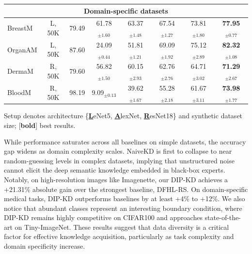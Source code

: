 \begin{table}[ht]
\begin{threeparttable}
\begin{tabular}{l c c c c c c c}
      \multicolumn{8}{c}{\textbf{Domain-specific datasets}} \\
      \midrule
      BreastM  & L, 50K  & 79.49 & 61.78$_{\pm 1.60}$           & 63.37$_{\pm 1.48}$           & 67.54$_{\pm 1.27}$ & 73.81$_{\pm 1.80}$          & \textbf{77.95}$_{\pm 0.77}$ \\
      OrganAM  & L, 50K  & 87.60 & 24.09$_{\pm 0.44}$           & 51.81$_{\pm 1.21}$           & 69.09$_{\pm 1.92}$ & 75.12$_{\pm 2.89}$          & \textbf{82.32}$_{\pm 1.08}$ \\
      DermaM   & R, 50K  & 79.60 & 56.82$_{\pm 1.50}$           & 60.15$_{\pm 2.93}$           & 62.76$_{\pm 2.76}$ & 64.71$_{\pm 3.02}$          & \textbf{71.29}$_{\pm 2.67}$ \\
      BloodM   & R, 50K  & 98.19 & \phantom{0}9.09$_{\pm 0.13}$ & 39.62$_{\pm 1.67}$           & 55.28$_{\pm 2.18}$ & 61.67$_{\pm 3.11}$          & \textbf{73.98}$_{\pm 1.77}$ \\
      \bottomrule
    \end{tabular}
    \begin{tablenotes}[flushleft] \footnotesize
    \item {Setup denotes architecture \{\textbf{\underline{L}}eNet5, \textbf{\underline{A}}lexNet, \textbf{\underline{R}}esNet18\} and synthetic dataset size; [\textbf{bold}] best results.}
    \end{tablenotes}
  \end{threeparttable}
\end{table}

\begin{foldable}
  While performance saturates across all baselines on simple datasets, the accuracy gap widens as domain complexity scales.
  NaiveKD is first to collapse to near random-guessing levels in complex datasets, implying that unstructured noise cannot elicit the deep semantic knowledge embedded in black-box experts.
  Notably, on high-resolution images like Imagenette, our DIP-KD achieves a +21.31\% absolute gain over the strongest baseline, DFHL-RS.
  On domain-specific medical tasks, DIP-KD outperforms baselines by at least +4\% to +12\%.
  We also notice that abundant classes represent an interesting boundary condition, where DIP-KD remains highly competitive on CIFAR100 and approaches state-of-the-art on Tiny-ImageNet.
  These results suggest that data diversity is a critical factor for effective knowledge acquisition, particularly as task complexity and domain specificity increase.
\end{foldable}

